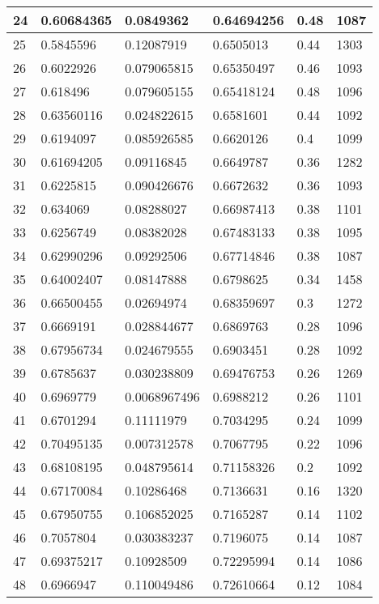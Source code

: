 \begin{longtable}{|l|l|l|l|l|l|}
24 & 0.60684365 & 0.0849362 & 0.64694256 & 0.48 & 1087 \\ \hline 
25 & 0.5845596 & 0.12087919 & 0.6505013 & 0.44 & 1303 \\ \hline 
26 & 0.6022926 & 0.079065815 & 0.65350497 & 0.46 & 1093 \\ \hline 
27 & 0.618496 & 0.079605155 & 0.65418124 & 0.48 & 1096 \\ \hline 
28 & 0.63560116 & 0.024822615 & 0.6581601 & 0.44 & 1092 \\ \hline 
29 & 0.6194097 & 0.085926585 & 0.6620126 & 0.4 & 1099 \\ \hline 
30 & 0.61694205 & 0.09116845 & 0.6649787 & 0.36 & 1282 \\ \hline 
31 & 0.6225815 & 0.090426676 & 0.6672632 & 0.36 & 1093 \\ \hline 
32 & 0.634069 & 0.08288027 & 0.66987413 & 0.38 & 1101 \\ \hline 
33 & 0.6256749 & 0.08382028 & 0.67483133 & 0.38 & 1095 \\ \hline 
34 & 0.62990296 & 0.09292506 & 0.67714846 & 0.38 & 1087 \\ \hline 
35 & 0.64002407 & 0.08147888 & 0.6798625 & 0.34 & 1458 \\ \hline 
36 & 0.66500455 & 0.02694974 & 0.68359697 & 0.3 & 1272 \\ \hline 
37 & 0.6669191 & 0.028844677 & 0.6869763 & 0.28 & 1096 \\ \hline 
38 & 0.67956734 & 0.024679555 & 0.6903451 & 0.28 & 1092 \\ \hline 
39 & 0.6785637 & 0.030238809 & 0.69476753 & 0.26 & 1269 \\ \hline 
40 & 0.6969779 & 0.0068967496 & 0.6988212 & 0.26 & 1101 \\ \hline 
41 & 0.6701294 & 0.11111979 & 0.7034295 & 0.24 & 1099 \\ \hline 
42 & 0.70495135 & 0.007312578 & 0.7067795 & 0.22 & 1096 \\ \hline 
43 & 0.68108195 & 0.048795614 & 0.71158326 & 0.2 & 1092 \\ \hline 
44 & 0.67170084 & 0.10286468 & 0.7136631 & 0.16 & 1320 \\ \hline 
45 & 0.67950755 & 0.106852025 & 0.7165287 & 0.14 & 1102 \\ \hline 
46 & 0.7057804 & 0.030383237 & 0.7196075 & 0.14 & 1087 \\ \hline 
47 & 0.69375217 & 0.10928509 & 0.72295994 & 0.14 & 1086 \\ \hline 
48 & 0.6966947 & 0.110049486 & 0.72610664 & 0.12 & 1084 \\ \hline 

\end{longtable}
